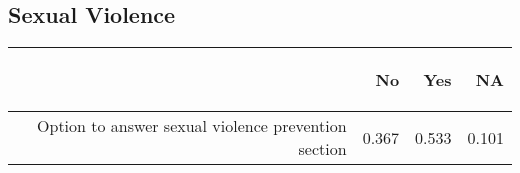 \documentclass{article}\usepackage[]{graphicx}\usepackage[]{color}
\begin{document}
\subsection{Sexual Violence}
\begin{table}[ht]
\centering
\begin{tabular}{rrrr}
  \hline
 & \begin{sideways} No \end{sideways} & \begin{sideways} Yes \end{sideways} & \begin{sideways} NA \end{sideways} \\ 
  \hline
Option to answer sexual violence prevention section & 0.367 & 0.533 & 0.101 \\ 
   \hline
\end{tabular}
\end{table}
\end{document}
